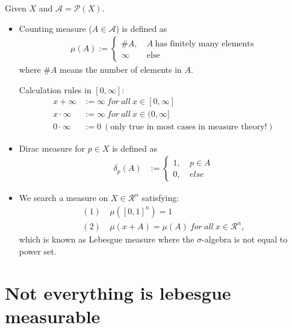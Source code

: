 \documentclass[../../note.tex]{subfiles}
\begin{document}
\begin{example}
    Given $X$ and $\mathcal{A} = \mathcal{P}(X)$.
    \begin{itemize}
        \item Counting measure ($A \in \mathcal{A}$) is defined as
        \begin{align}
            \mu(A):= \left\{
                \begin{matrix}
                    \#A,&~A~\text{has finitely many elements} \\
                    \infty&~\text{else}
                \end{matrix}
            \right.
        \end{align}
        where $\# A$ means the number of elements in $A$.

        Calculation rules in $[0,\infty]$:
        \begin{align}
            x+\infty&:= \infty~for~all~x\in[0,\infty] \\
            x\cdot \infty&:= \infty~for~all~x\in(0,\infty] \\
            0\cdot \infty&:= 0~(\text{only true in most cases in measure theory!})
        \end{align}
    \item Dirac measure for $p \in X$ is defined as
    \begin{align}
        \delta_{p}(A)
        &:= \left\{
            \begin{matrix}
                1,~& p \in A \\
                0,~& else
            \end{matrix}
        \right.
    \end{align}
    \item We search a measure on $X \in \mathcal{R}^n$ satisfying:
    \begin{align}
        (1)~&\mu([0,1]^n) = 1 \\
        (2)~&\mu(x+A) = \mu(A)~for~all~x\in \mathcal{R}^n,
    \end{align}
    which is known as Lebesgue measure where the $\sigma$-algebra is not equal to power set.
\end{itemize}
\end{example}

\section{Not everything is lebesgue measurable}
\end{document}
